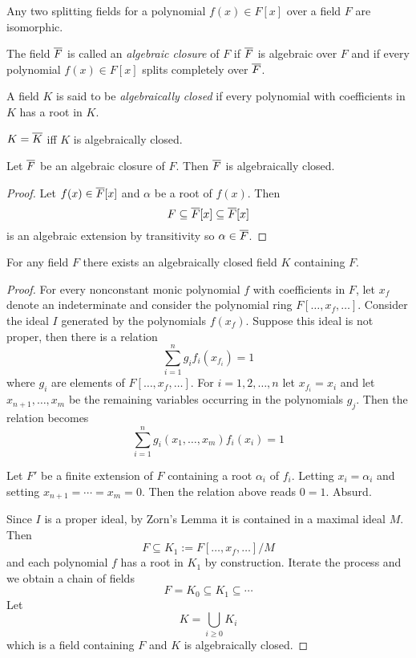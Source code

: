 \documentclass[a4paper]{article}
\begin{document}
\begin{cor}
  Any two splitting fields for a polynomial $f(x)\in F[x]$ over a field $F$ are isomorphic.
\end{cor}

\begin{defi}
  The field $\overline{F}$ is called an \emph{algebraic closure} of $F$ if $\overline{F}$ is algebraic over $F$ and if every polynomial $f(x)\in F[x]$ splits completely over $\overline{F}$.
\end{defi}

\begin{defi}
  A field $K$ is said to be \emph{algebraically closed} if every polynomial with coefficients in $K$ has a root in $K$.
\end{defi}

$K=\overline{K}$ iff $K$ is algebraically closed.

\begin{prop}
  Let $\overline{F}$ be an algebraic closure of $F$. Then $\overline{F}$ is algebraically closed.
\end{prop}

\begin{proof}
  Let $f(x)\in\overline{F}[x]$ and $\alpha$ be a root of $f(x)$. Then
  \[ F \subseteq \overline{F}[x] \subseteq \overline{F}[x] \]
  is an algebraic extension by transitivity so $\alpha\in\overline{F}$.
\end{proof}

\begin{prop}
  For any field $F$ there exists an algebraically closed field $K$ containing $F$.
\end{prop}

\begin{proof}
  For every nonconstant monic polynomial $f$ with coefficients in $F$, let $x_f$ denote an indeterminate and consider the polynomial ring $F[\ldots,x_f,\ldots]$. Consider the ideal $I$ generated by the polynomials $f(x_f)$. Suppose this ideal is not proper, then there is a relation
  \[ \sum_{i=1}^n g_i f_i(x_{f_i}) = 1 \]
  where $g_i$ are elements of $F[\ldots,x_f,\ldots]$. For $i=1,2,\ldots,n$ let $x_{f_i}=x_i$ and let $x_{n+1},\ldots,x_m$ be the remaining variables occurring in the polynomials $g_j$. Then the relation becomes
  \[ \sum_{i=1}^n g_i(x_1,\ldots,x_m) f_i(x_i) = 1 \]

  Let $F'$ be a finite extension of $F$ containing a root $\alpha_i$ of $f_i$. Letting $x_i = \alpha_i$ and setting $x_{n+1}=\cdots=x_m=0$. Then the relation above reads $0=1$. Absurd.

  Since $I$ is a proper ideal, by Zorn's Lemma it is contained in a maximal ideal $M$. Then
  \[ F \subseteq K_1:= F[\ldots,x_f,\ldots]/M \]
  and each polynomial $f$ has a root in $K_1$ by construction. Iterate the process and we obtain a chain of fields
  \[ F= K_0 \subseteq K_1 \subseteq \cdots \]
  Let
  \[ K = \bigcup_{i\geq0} K_i \]
  which is a field containing $F$ and $K$ is algebraically closed.
\end{proof}
\end{document}
